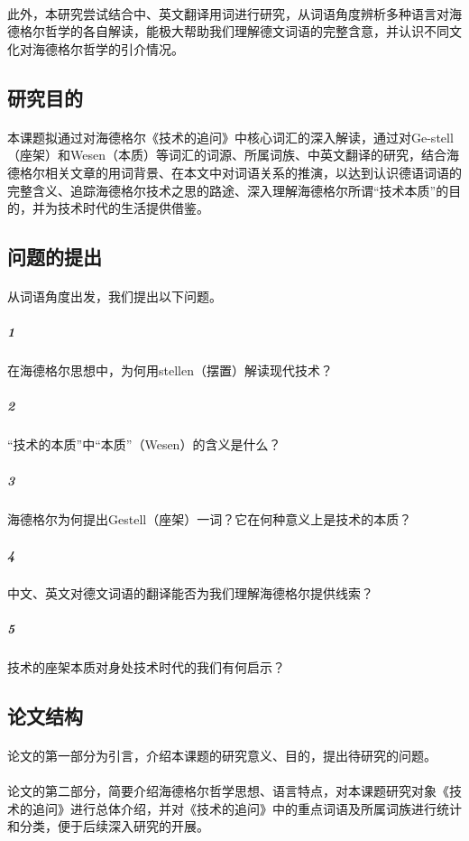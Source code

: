 \documentclass{article}
\begin{document}
		\paragraph{}
此外，本研究尝试结合中、英文翻译用词进行研究，从词语角度辨析多种语言对海德格尔哲学的各自解读，能极大帮助我们理解德文词语的完整含意，并认识不同文化对海德格尔哲学的引介情况。
	
	\subsection{研究目的}
		\paragraph{}
        本课题拟通过对海德格尔《技术的追问》中核心词汇的深入解读，通过对Ge-stell（座架）和Wesen（本质）等词汇的词源、所属词族、中英文翻译的研究，结合海德格尔相关文章的用词背景、在本文中对词语关系的推演，以达到认识德语词语的完整含义、追踪海德格尔技术之思的路途、深入理解海德格尔所谓“技术本质”的目的，并为技术时代的生活提供借鉴。
    \subsection{问题的提出}
		\paragraph{}
     	从词语角度出发，我们提出以下问题。
		\subparagraph{1} 
            在海德格尔思想中，为何用stellen（摆置）解读现代技术？
		\subparagraph{2} 
           “技术的本质”中“本质”（Wesen）的含义是什么？
		\subparagraph{3}海德格尔为何提出Gestell（座架）一词？它在何种意义上是技术的本质？
		\subparagraph{4}中文、英文对德文词语的翻译能否为我们理解海德格尔提供线索？
		\subparagraph{5}技术的座架本质对身处技术时代的我们有何启示？
	\subsection{论文结构}
		\paragraph{}
        论文的第一部分为引言，介绍本课题的研究意义、目的，提出待研究的问题。
		\paragraph{}
        论文的第二部分，简要介绍海德格尔哲学思想、语言特点，对本课题研究对象《技术的追问》进行总体介绍，并对《技术的追问》中的重点词语及所属词族进行统计和分类，便于后续深入研究的开展。
\end{document}
